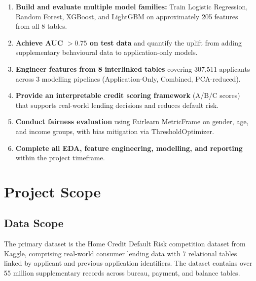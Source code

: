\begin{enumerate}
    \item \textbf{Build and evaluate multiple model families:} Train Logistic Regression, Random Forest, XGBoost, and LightGBM on approximately 205 features from all 8 tables.
    \item \textbf{Achieve AUC $> 0.75$ on test data} and quantify the uplift from adding supplementary behavioural data to application-only models.
    \item \textbf{Engineer features from 8 interlinked tables} covering 307,511 applicants across 3 modelling pipelines (Application-Only, Combined, PCA-reduced).
    \item \textbf{Provide an interpretable credit scoring framework} (A/B/C scores) that supports real-world lending decisions and reduces default risk.
    \item \textbf{Conduct fairness evaluation} using Fairlearn MetricFrame on gender, age, and income groups, with bias mitigation via ThresholdOptimizer.
    \item \textbf{Complete all EDA, feature engineering, modelling, and reporting} within the project timeframe.
\end{enumerate}

\section{Project Scope}
\label{sec:project_scope}

\subsection{Data Scope}

The primary dataset is the Home Credit Default Risk competition dataset from Kaggle, comprising real-world consumer lending data with 7 relational tables linked by applicant and previous application identifiers. The dataset contains over 55 million supplementary records across bureau, payment, and balance tables.

